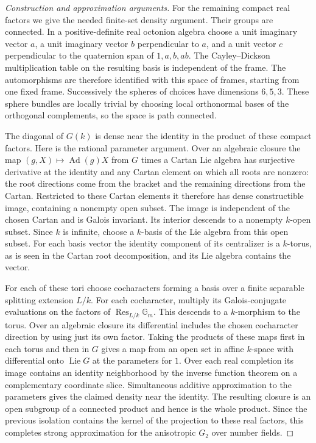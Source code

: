\documentclass[11pt,a4paper,openany,oneside]{book}
\theoremstyle{resultstyle}
\theoremstyle{definition}
\numberwithin{equation}{chapter}
\begin{document}
\begin{proof}[Construction and approximation arguments]
For the remaining compact real factors we give the needed
finite-set density argument. Their groups are connected.
In a positive-definite real octonion algebra choose a
unit imaginary vector \(a\), a unit imaginary vector \(b\)
perpendicular to \(a\), and a unit vector \(c\)
perpendicular to the quaternion span of \(1,a,b,ab\).
The Cayley--Dickson multiplication table on the resulting
basis is independent of the frame. The automorphisms are
therefore identified with this space of frames, starting
from one fixed frame. Successively the spheres of choices
have dimensions \(6,5,3\). These sphere bundles are locally
trivial by choosing local orthonormal bases of the
orthogonal complements, so the space is path connected.

The diagonal of \(G(k)\) is dense near the identity in
the product of these compact factors. Here is the rational
parameter argument. Over an algebraic closure the map
\((g,X)\mapsto\operatorname{Ad}(g)X\) from \(G\) times a
Cartan Lie algebra has surjective derivative at the
identity and any Cartan element on which all roots are
nonzero: the root directions come from the bracket and
the remaining directions from the Cartan. Restricted to
these Cartan elements it therefore has dense constructible
image, containing a nonempty open subset. The image is
independent of the chosen Cartan and is Galois invariant.
Its interior descends to a nonempty \(k\)-open subset.
Since \(k\) is infinite, choose a \(k\)-basis of the Lie
algebra from this open subset. For each basis vector the
identity component of its centralizer is a \(k\)-torus,
as is seen in the Cartan root decomposition, and its Lie
algebra contains the vector.

For each of these tori choose cocharacters forming a
basis over a finite separable splitting extension \(L/k\).
For each cocharacter, multiply its Galois-conjugate
evaluations on the factors of
\(\operatorname{Res}_{L/k}\mathbb G_m\).
This descends to a \(k\)-morphism to the torus. Over an
algebraic closure its differential includes the chosen
cocharacter direction by using just its own factor.
Taking the products of these maps first in each torus and
then in \(G\) gives a map from an open set in affine
\(k\)-space with differential onto \(\operatorname{Lie}G\)
at the parameters for \(1\). Over each real completion
its image contains an identity neighborhood by the
inverse function theorem on a complementary coordinate
slice. Simultaneous additive approximation to the
parameters gives the claimed density near the identity.
The resulting closure is an open subgroup of a connected
product and hence is the whole product. Since the
previous isolation contains the kernel of the projection
to these real factors, this completes strong approximation
for the anisotropic \(G_2\) over number fields.


\end{proof}
\end{document}
